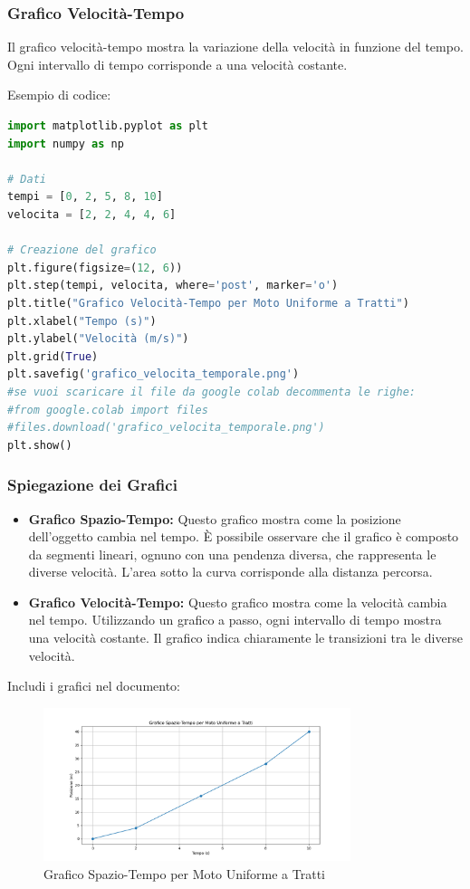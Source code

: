 \subsubsection{Grafico Velocità-Tempo}
Il grafico velocità-tempo mostra la variazione della velocità in funzione del tempo. Ogni intervallo di tempo corrisponde a una velocità costante.

Esempio di codice:
\begin{lstlisting}[language=Python]
import matplotlib.pyplot as plt
import numpy as np

# Dati
tempi = [0, 2, 5, 8, 10]
velocita = [2, 2, 4, 4, 6]

# Creazione del grafico
plt.figure(figsize=(12, 6))
plt.step(tempi, velocita, where='post', marker='o')
plt.title("Grafico Velocità-Tempo per Moto Uniforme a Tratti")
plt.xlabel("Tempo (s)")
plt.ylabel("Velocità (m/s)")
plt.grid(True)
plt.savefig('grafico_velocita_temporale.png')
#se vuoi scaricare il file da google colab decommenta le righe:
#from google.colab import files
#files.download('grafico_velocita_temporale.png')
plt.show()
\end{lstlisting}

\subsubsection{Spiegazione dei Grafici}
\begin{itemize}
    \item \textbf{Grafico Spazio-Tempo:} Questo grafico mostra come la posizione dell'oggetto cambia nel tempo. È possibile osservare che il grafico è composto da segmenti lineari, ognuno con una pendenza diversa, che rappresenta le diverse velocità. L'area sotto la curva corrisponde alla distanza percorsa.
    \item \textbf{Grafico Velocità-Tempo:} Questo grafico mostra come la velocità cambia nel tempo. Utilizzando un grafico a passo, ogni intervallo di tempo mostra una velocità costante. Il grafico indica chiaramente le transizioni tra le diverse velocità.
\end{itemize}

Includi i grafici nel documento:
\begin{figure}[h!]
    \centering
    \includegraphics[width=0.8\textwidth]{grafico_spazio_temporale.png}
    \caption{Grafico Spazio-Tempo per Moto Uniforme a Tratti}
    \label{fig:spazio_temporale}
\end{figure}

